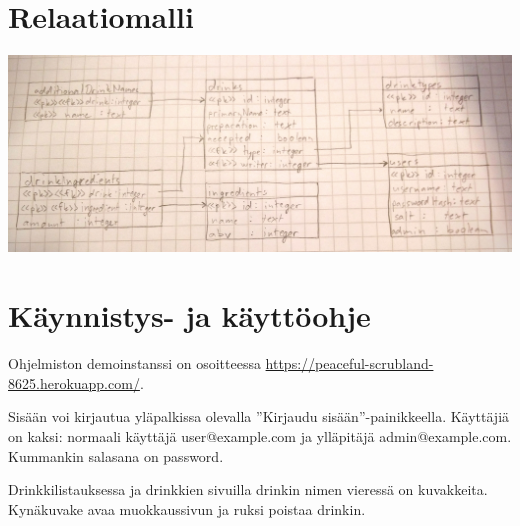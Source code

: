 \documentclass[a4paper]{article}
\begin{document}
\section{Relaatiomalli}
\includegraphics[width=\textwidth]{relation-diagram}
\section{Käynnistys- ja käyttöohje}
Ohjelmiston demoinstanssi on osoitteessa \url{https://peaceful-scrubland-8625.herokuapp.com/}.

Sisään voi kirjautua yläpalkissa olevalla ''Kirjaudu sisään''-painikkeella. Käyttäjiä on kaksi: normaali käyttäjä user@example.com ja ylläpitäjä admin@example.com. Kummankin salasana on password.

Drinkkilistauksessa ja drinkkien sivuilla drinkin nimen vieressä on kuvakkeita. Kynäkuvake avaa muokkaussivun ja ruksi poistaa drinkin.
\end{document}
